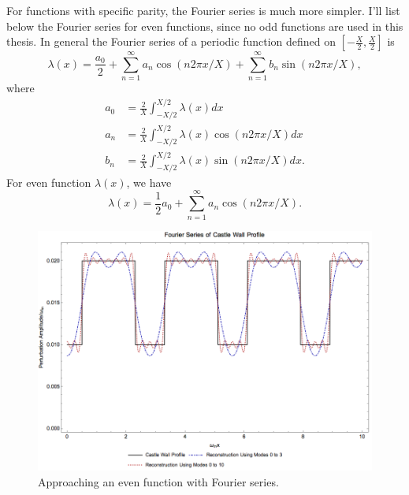 For functions with specific parity, the Fourier series is much more simpler. I'll list below the Fourier series for even functions, since no odd functions are used in this thesis. In general the Fourier series of a periodic function defined on $\left[ -\frac{X}{2}, \frac{X}{2} \right]$ is
\begin{equation}
      \lambda(x) = \frac{a_0}{2} + \sum_{n=1}^\infty a_n \cos(n 2\pi x/X) + \sum_{n=1}^\infty b_n \sin(n 2\pi x/X),
\end{equation}
where
\begin{align}
    a_0 & = \frac{2}{X} \int^{X/2}_{-X/2} \lambda(x) d x \\
    a_n & = \frac{2}{X} \int_{-X/2}^{X/2} \lambda(x) \cos ( n2\pi x/X ) dx\\
    b_n & = \frac{2}{X} \int_{-X/2}^{X/2} \lambda(x) \sin( n 2\pi x/X ) dx.
\end{align}
For even function $\lambda(x)$, we have
\begin{equation}
      \lambda(x) = \frac{1}{2}a_0 + \sum_{n=1}^\infty a_n \cos (n 2\pi x/X).
\end{equation}

\begin{figure}
    \centering
    \includegraphics[width=\textwidth]{chapters/assets/app/reconstruction-of-even-castle-wall-0point01-0point02-1-1point8.png}
    \caption{Approaching an even function with Fourier series.}
    \label{app-chap:convention-sec:fourier-series-eqn:parametric-resonance-castle-wall-fourier-coeff-even}
\end{figure}

